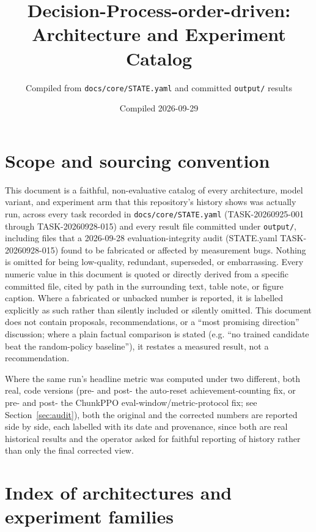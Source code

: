 \documentclass[11pt]{article}
\title{Decision-Process-order-driven: Architecture and Experiment Catalog}
\author{Compiled from \texttt{docs/core/STATE.yaml} and committed \texttt{output/} results}
\date{Compiled 2026-09-29}
\newcommand{\srcpath}[1]{\texttt{\small #1}}
\begin{document}
\maketitle

\section*{Scope and sourcing convention}

This document is a faithful, non-evaluative catalog of every architecture, model variant, and
experiment arm that this repository's history shows was actually run, across every task recorded
in \srcpath{docs/core/STATE.yaml} (TASK-20260925-001 through TASK-20260928-015) and every result
file committed under \texttt{output/}, including files that a 2026-09-28 evaluation-integrity
audit (STATE.yaml TASK-20260928-015) found to be fabricated or affected by measurement bugs.
Nothing is omitted for being low-quality, redundant, superseded, or embarrassing. Every numeric
value in this document is quoted or directly derived from a specific committed file, cited by path
in the surrounding text, table note, or figure caption. Where a fabricated or unbacked number is
reported, it is labelled explicitly as such rather than silently included or silently omitted.
This document does not contain proposals, recommendations, or a ``most promising direction''
discussion; where a plain factual comparison is stated (e.g. ``no trained candidate beat the
random-policy baseline''), it restates a measured result, not a recommendation.

Where the same run's headline metric was computed under two different, both real, code versions
(pre- and post- the auto-reset achievement-counting fix, or pre- and post- the ChunkPPO
eval-window/metric-protocol fix; see Section~\ref{sec:audit}), both the original and the corrected
numbers are reported side by side, each labelled with its date and provenance, since both are real
historical results and the operator asked for faithful reporting of history rather than only the
final corrected view.

\section*{Index of architectures and experiment families}
\end{document}
